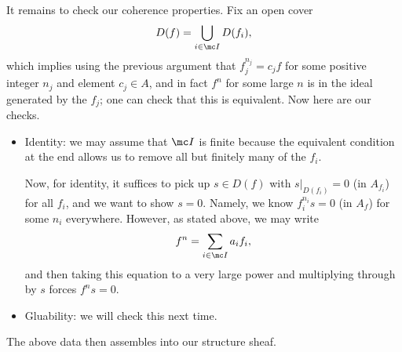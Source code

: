 \documentclass[../notes.tex]{subfiles}
\begin{document}
It remains to check our coherence properties. Fix an open cover
\[D(f)=\bigcup_{i\in\mc I}D(f_i),\]
which implies using the previous argument that $f_j^{n_j}=c_jf$ for some positive integer $n_j$ and element $c_j\in A$, and in fact $f^n$ for some large $n$ is in the ideal generated by the $f_j$; one can check that this is equivalent. Now here are our checks.
\begin{itemize}
	\item Identity: we may assume that $\mc I$ is finite because the equivalent condition at the end allows us to remove all but finitely many of the $f_i$.

	Now, for identity, it suffices to pick up $s\in D(f)$ with $s|_{D(f_i)}=0$ (in $A_{f_i}$) for all $f_i$, and we want to show $s=0$. Namely, we know $f_i^{n_i}s=0$ (in $A_f$) for some $n_i$ everywhere. However, as stated above, we may write
	\[f^n=\sum_{i\in\mc I}a_if_i,\]
	and then taking this equation to a very large power and multiplying through by $s$ forces $f^ns=0$.
	\item Gluability: we will check this next time.
\end{itemize}
The above data then assembles into our structure sheaf.
\end{document}
